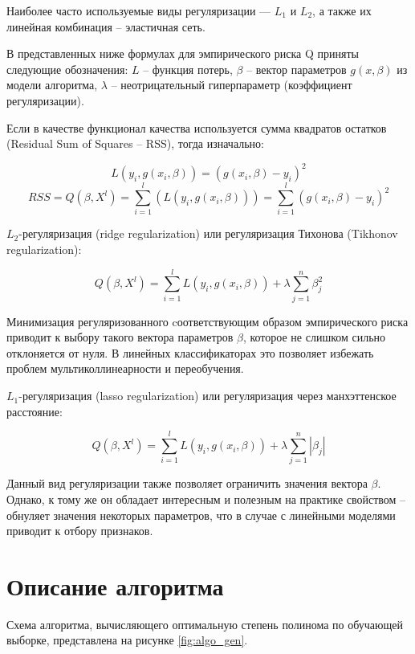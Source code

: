 \documentclass[12pt]{report}
\begin{document}
Наиболее часто используемые виды регуляризации — $L_1$ и $L_2$, а также их линейная комбинация -- эластичная сеть. 

В представленных ниже формулах для эмпирического риска Q приняты следующие обозначения: $L$ -- функция потерь, $\beta$ -- вектор параметров $g(x,\beta)$ из модели алгоритма, $\lambda$ -- неотрицательный гиперпараметр (коэффициент регуляризации).

Если в качестве функционал качества используется сумма квадратов остатков (Residual Sum of Squares -- RSS), тогда изначально: 

\begin{equation}
    L(y_i, g(x_i, \beta)) = (g(x_i, \beta) - y_i)^2
\end{equation}
\begin{equation}
RSS=Q(\beta,X^l )=\sum_{i=1}^l(L(y_i,g(x_i,\beta)))=\sum_{i=1}^l(g(x_i,\beta)-y_i )^2 
\end{equation}

$L_2$-регуляризация (ridge regularization) или регуляризация Тихонова (Tikhonov regularization):

\begin{equation}
Q(\beta,X^l )=\sum_{i=1}^l L(y_i,g(x_i,\beta)) + \lambda \sum_{j=1}^n \beta_j^2 
\end{equation}

Минимизация регуляризованного cоответствующим образом эмпирического риска приводит к выбору такого вектора параметров $\beta$, которое не слишком сильно отклоняется от нуля. В линейных классификаторах это позволяет избежать проблем мультиколлинеарности и переобучения.

$L_1$-регуляризация (lasso regularization) или регуляризация через манхэттенское расстояние:

\begin{equation}
Q(\beta,X^l )=\sum_{i=1}^l L(y_i,g(x_i,\beta)) + \lambda \sum_{j=1}^n |\beta_j|
\end{equation}

Данный вид регуляризации также позволяет ограничить значения вектора $\beta$. Однако, к тому же он обладает интересным и полезным на практике свойством -- обнуляет значения некоторых параметров, что в случае с линейными моделями приводит к отбору признаков.
\section{Описание алгоритма}
Схема алгоритма, вычисляющего оптимальную степень полинома по обучающей выборке, представлена на рисунке \ref{fig:algo_gen}. 
\end{document}
